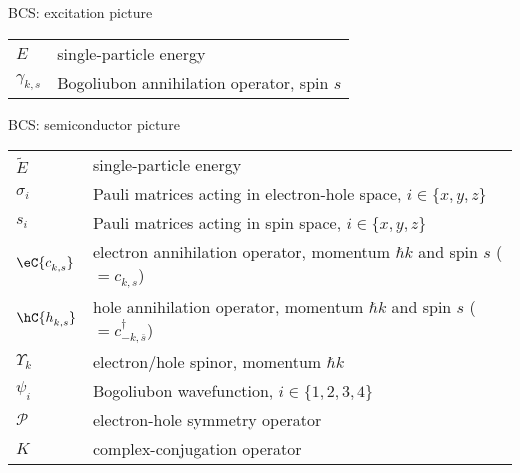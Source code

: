 {\Large\noindent BCS: excitation picture}
\vspace{-.2cm}
\begin{longtable}{ m{5em} m{29em}}
$E$ & single-particle energy \\
$\gamma_{k,s}^{}$ & Bogoliubon annihilation operator, spin $s$ \\
\end{longtable}
\vspace{.2cm}

{\Large\noindent BCS: semiconductor picture}
\vspace{-.2cm}
\begin{longtable}{ m{5em} m{29em}}
$\tilde{E}$ & single-particle energy \\
$\sigma_i$ & Pauli matrices acting in electron-hole space, $i \in \{x, y, z\}$ \\
$s_i$ & Pauli matrices acting in spin space, $i \in \{x, y, z\}$ \\
$\eC{c_{k,s}^{}}$ & electron annihilation operator, momentum $\hbar k$ and spin $s$ ($= c_{k,s}^{}$) \\
$\hC{h_{k,s}^{}}$ & hole annihilation operator, momentum $\hbar k$ and spin $s$ ($= c_{-k,\overline{s}}^\dagger$) \\
$\Upsilon_k$ & electron/hole spinor, momentum $\hbar k$ \\
$\psi_i$ & Bogoliubon wavefunction, $i \in \{1, 2, 3, 4\}$ \\
$\mathcal{P}$ & electron-hole symmetry operator \\
$K$ & complex-conjugation operator \\

\end{longtable}
\vspace{.2cm}

